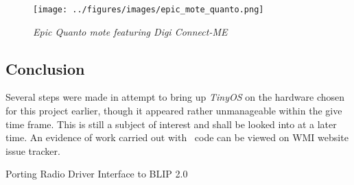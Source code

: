 \begin{figure}
\texttt{[image: ../figures/images/epic\_mote\_quanto.png]}
\caption{\emph{Epic Quanto mote featuring Digi Connect-ME}}\label{fig:mote:quanto}
\end{figure}


\subsection{Conclusion}

  Several steps were made in attempt to bring up \emph{TinyOS} on the
 hardware chosen for this project earlier, though it appeared rather
 unmanageable within the give time frame. This is still a subject of
 interest and shall be looked into at a later time. An evidence of
 work carried out with \TinyOS\ code can be viewed on WMI website
 issue tracker.

\TrackerList
  Porting Radio Driver Interface to BLIP 2.0
\TrackerEnd


